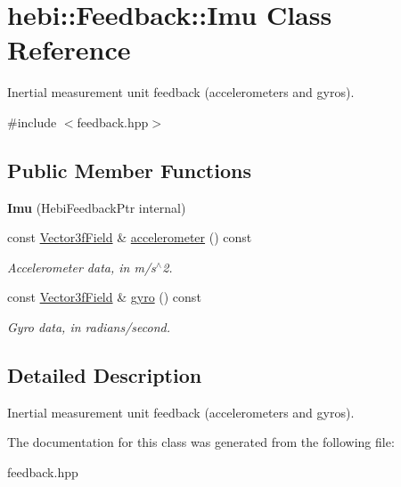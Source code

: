 \hypertarget{classhebi_1_1Feedback_1_1Imu}{}\section{hebi\+:\+:Feedback\+:\+:Imu Class Reference}
\label{classhebi_1_1Feedback_1_1Imu}


Inertial measurement unit feedback (accelerometers and gyros).  




{\ttfamily \#include $<$feedback.\+hpp$>$}

\subsection*{Public Member Functions}
\begin{DoxyCompactItemize}
\item 
\mbox{\label{classhebi_1_1Feedback_1_1Imu_ac74ce28691c1e85409d0a41a9d0fd959}} 
{\bfseries Imu} (Hebi\+Feedback\+Ptr internal)
\item 
\mbox{\label{classhebi_1_1Feedback_1_1Imu_a0af70c575bc639f4c62e290076d7e8de}} 
const \hyperlink{classhebi_1_1Feedback_1_1Vector3fField}{Vector3f\+Field} \& \hyperlink{classhebi_1_1Feedback_1_1Imu_a0af70c575bc639f4c62e290076d7e8de}{accelerometer} () const
\begin{DoxyCompactList}\small\item\em Accelerometer data, in m/s$^\wedge$2. \end{DoxyCompactList}\item 
\mbox{\label{classhebi_1_1Feedback_1_1Imu_a1621bd14bd3d38a8a832f4401777c27d}} 
const \hyperlink{classhebi_1_1Feedback_1_1Vector3fField}{Vector3f\+Field} \& \hyperlink{classhebi_1_1Feedback_1_1Imu_a1621bd14bd3d38a8a832f4401777c27d}{gyro} () const
\begin{DoxyCompactList}\small\item\em Gyro data, in radians/second. \end{DoxyCompactList}\end{DoxyCompactItemize}


\subsection{Detailed Description}
Inertial measurement unit feedback (accelerometers and gyros). 

The documentation for this class was generated from the following file\+:\begin{DoxyCompactItemize}
\item 
feedback.\+hpp\end{DoxyCompactItemize}
